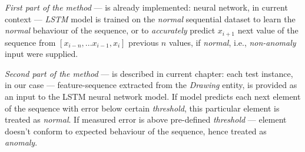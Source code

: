 \textit{First part of the method} --- is already implemented: neural network, in current context --- \textit{LSTM} model is trained on the \textit{normal} sequential dataset to learn the \textit{normal} behaviour of the sequence, or to \textit{accurately} predict $x_{i+1}$ next value of the sequence from $[x_{i-n}, ...x_{i-1}, x_i]$ previous $n$ values, if \textit{normal}, i.e., \textit{non-anomaly} input were supplied.

\textit{Second part of the method} --- is described in current chapter: each test instance, in our case --- feature-sequence extracted from the \textit{Drawing} entity, is provided as an input to the LSTM neural network model. If model predicts each next element of the sequence with error below certain \textit{threshold}, this particular element is treated as \textit{normal}. If measured error is above pre-defined \textit{threshold} --- element doesn't conform to expected behaviour of the sequence, hence treated as \textit{anomaly}.

